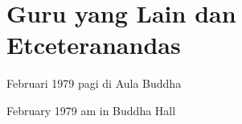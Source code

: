 \chapter{Guru yang Lain dan Etceteranandas} %

 Februari 1979 pagi di Aula Buddha

 February 1979 am in Buddha Hall



